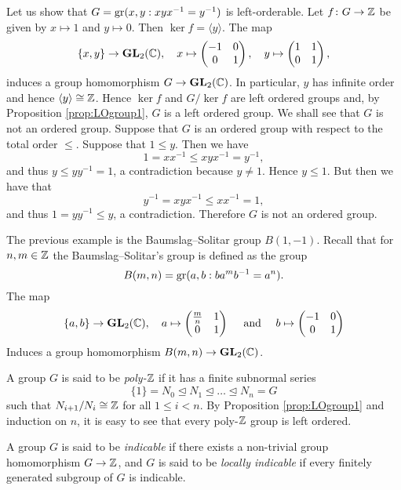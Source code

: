 \begin{example}
	Let us show that $G=\operatorname{gr}( x,y:xyx^{-1}=y^{-1})$ is left-orderable. Let 
	$f\colon G\to\mathbb{Z}$ be given by $x\mapsto 1$ and $y\mapsto 0$. Then $\ker f=\langle y\rangle$. 
	 The map
\[
\{ x,y\}\to\mathbf{GL}_2(\mathbb{C}),
\quad 
x\mapsto\begin{pmatrix}
-1&0\\
0&1	
\end{pmatrix},
\quad
y\mapsto\begin{pmatrix}
1&1\\
0&1	
\end{pmatrix},
\]
induces a group homomorphism $G\to \mathbf{GL}_2(\mathbb{C})$. 
In particular, $y$ has infinite order and hence $\langle y\rangle\cong\mathbb{Z}$. Hence $\ker f$ and $G/\ker f$ are left ordered groups and, by Proposition \ref{prop:LOgroup1}, $G$ is a left ordered group. We shall see that $G$ is not an ordered group. Suppose that $G$ is an ordered group with respect to the total order $\leq$. Suppose that $1\leq y$. Then we have
\[ 1=xx^{-1}\leq xyx^{-1}=y^{-1},\]
and thus $y\leq yy^{-1}=1$, a contradiction because $y\neq 1$. Hence $y\leq 1$. But then we have that
\[ y^{-1}=xyx^{-1}\leq xx^{-1}=1,\]
and thus $1=yy^{-1}\leq  y$, a contradiction. Therefore $G$ is not an ordered group.
\end{example}

The previous example is the Baumslag--Solitar group $B(1,-1)$. Recall that for $n,m\in\mathbb{Z}$
the Baumslag--Solitar's group is defined as the 
group \[
B(m,n)=\operatorname{gr}(a,b:ba^mb^{-1}=a^n).
\]
The map 
\[
\{ a,b\}\to\mathbf{GL}_2(\mathbb{C}),\quad
a\mapsto\begin{pmatrix}
\frac{m}{n}&1\\
0&1	
\end{pmatrix}\quad\text{ and }\quad  
b\mapsto\begin{pmatrix}
-1&0\\
0&1	
\end{pmatrix}
\] 
Induces a group homomorphism $B(m,n)\to \mathbf{GL}_2(\mathbb{C})$.



A group $G$ is said to be {\em poly-$\mathbb{Z}$} if it has a finite subnormal series
\[ \{ 1\}=N_0\unlhd N_1\unlhd\dots\unlhd N_n=G\]
such that $N_{i+1}/N_{i}\cong \mathbb{Z}$ for all $1\leq i<n$.
By Proposition \ref{prop:LOgroup1} and induction on $n$, it is easy to see that every poly-$\mathbb{Z}$ group is left ordered. 

A group $G$ is said to be {\em indicable} if there exists a non-trivial 
group homomorphism $G\to\mathbb{Z}$, and $G$ is said to be {\em locally indicable} 
if every finitely generated subgroup of $G$ is indicable.  

